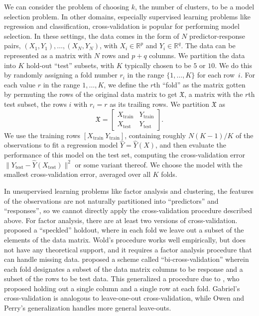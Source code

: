 \documentclass[12pt]{article}
\newcommand{\R}{\mathbb{R}}
\newcommand{\dataX}{\mathfrak{X}}
\newcommand{\Xtrain}{X_{\text{train}}}
\newcommand{\Ytrain}{Y_{\text{train}}}
\newcommand{\Xtest}{X_{\text{test}}}
\newcommand{\Ytest}{Y_{\text{test}}}
\begin{document}
We can consider the problem of choosing $k$, the number of clusters, to be a
model selection problem. In other domains, especially supervised learning
problems like regression and classification, cross-validation is popular for
performing model selection.
In these settings, the data comes in the form of $N$
predictor-response pairs, $(X_1, Y_1), \dotsc, (X_N, Y_N)$, with $X_i \in
\R^{p}$ and $Y_i \in \R^{q}$.  The data can be represented as a matrix with
$N$ rows and $p + q$ columns.  We partition the data into $K$ hold-out
``test'' subsets, with $K$ typically chosen to be $5$ or $10$.  We do this
by randomly assigning a fold number $r_i$ in the range $\{1, \dotsc, K\}$
for each row~$i$. For each value $r$ in the range $1, \dotsc, K$, we define
the $r$th ``fold'' as the matrix gotten by permuting the rows of the 
original data matrix to get $\dataX$, a matrix with the
$r$th test subset, the rows $i$ with $r_i = r$ as its trailing rows.  
We partition $\dataX$ as
\[
  \dataX =
  \begin{bmatrix}
    \Xtrain & \Ytrain \\
    \Xtest  & \Ytest
  \end{bmatrix}.
\]
We use the training rows $[ \Xtrain\ \Ytrain ]$, containing roughly $N
(K-1)/K$ of the observations to fit a regression model
$\hat Y = \hat Y(X)$, and then evaluate the performance of this model on the
test set, computing the cross-validation error $\|\Ytest - \hat Y(\Xtest)\|^2$
or some variant thereof.  We choose the model with the smallest
cross-validation error, averaged over all $K$ folds.

In unsupervised learning problems like factor analysis and clustering, the
features of the observations are not naturally partitioned into ``predictors''
and ``responses'', so we cannot directly apply the cross-validation procedure
described above.  For factor analysis, there are at least two versions of
cross-validation.  \citet{wold78cross} proposed a ``speckled'' holdout, where
in each fold we leave out a subset of the elements of the data matrix.  Wold's
procedure works well empirically, but does not have any theoretical support,
and it requires a factor analysis procedure that can handle missing data.
\citet{owen2009bi} proposed a scheme called ``bi-cross-validation'' wherein
each fold designates a subset of the data matrix columns to be response and a
subset of the rows to be test data.  This generalized a procedure due to
\citet{gabriel2002biblot}, who proposed holding out a single column and a
single row at each fold. Gabriel's cross-validation is analogous to
leave-one-out cross-validation, while Owen and Perry's generalization handles
more general leave-outs.
\end{document}
